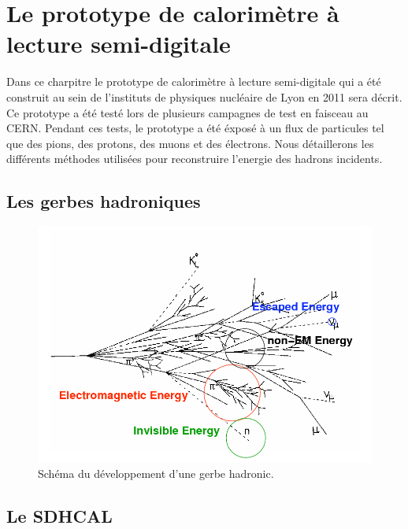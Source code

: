\chapter{Le prototype de calorimètre à lecture semi-digitale}
Dans ce charpitre le prototype de calorimètre à lecture semi-digitale qui a été construit au sein de l'instituts de physiques nucléaire de Lyon en 2011 sera décrit. Ce prototype a été testé lors de plusieurs campagnes de test en faisceau au CERN. Pendant ces tests, le prototype a été éxposé à un flux de particules tel que des pions, des protons, des muons et des électrons. Nous détaillerons les différents méthodes utilisées pour reconstruire l'energie des hadrons incidents. 
\minitoc
\newpage


\section{Les gerbes hadroniques}

\begin{figure}[!h]
  \begin{center}
    \includegraphics[width=.8\textwidth]{SDHCAL/figs/had-shower.png}
    \caption{Schéma du développement d'une gerbe hadronic.}
    \label{fig:showerScheme}
  \end{center}
\end{figure}


\section{Le SDHCAL}

